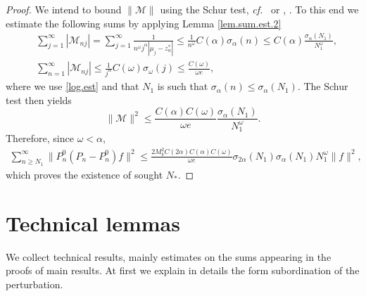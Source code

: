 \begin{proof}
We intend to bound $\|\mathcal{M}\|$ using the Schur test, {\emph{cf.}}~\cite{Schur-1911-140} or \cite[Sec. 3]{Dym-2003-210}, \cite[Thm. 5.2]{Halmos-1978-96}. To this end we estimate the following sums by applying Lemma \ref{lem.sum.est.2}
\begin{equation*}
\begin{aligned}
& \sum_{j=1}^{\infty}|\mathcal{M}_{nj}| 
=
\sum_{j=1}^{\infty} \frac{1}{n^{\omega}j^{\alpha}|\mu_j-z_n^*|}
\leq 
\frac{1}{n^{\omega}} C(\alpha) \sigma_{\alpha}(n)
\leq 
C(\alpha) \frac{\sigma_{\alpha}(N_1)}{N_1^{\omega}},
\\
&\sum_{n=1}^{\infty}|\mathcal{M}_{nj}| 
\leq
\frac{1}{j^{\alpha}}
C(\omega)
\sigma_{\omega}(j)
\leq
\frac{C(\omega)}{\omega e}
,
\end{aligned}
\end{equation*}
where we use \eqref{log.est} and that $N_1$ is such that $\sigma_{\alpha}(n) \leq \sigma_{\alpha}(N_1)$. 
The Schur test then yields
\begin{equation*}
\|\mathcal{M}\|^2
\leq 
 \frac{C(\alpha) C(\omega)}{\omega e}   
\frac{\sigma_{\alpha}(N_1)}{N_1^{\omega}}.
\end{equation*}
Therefore, since $\omega < \alpha$, 
\begin{equation*}
\begin{aligned}
\sum_{n\geq N_1}^{\infty} \|P_n^0(P_n-P_n^0)f\|^2 
\leq  
\frac{2 M_b^2 C(2\alpha) C(\alpha) C(\omega)}{\omega e}   
\sigma_{2\alpha}(N_1) \sigma_{\alpha}(N_1) N_1^{\omega} 
\|f\|^2,
\end{aligned}
\end{equation*}
which proves the existence of sought $N_*$.

\end{proof}

\section{Technical lemmas}
\label{sec.tech.lem}

We collect technical results, mainly estimates on the sums appearing in the proofs of main results. At first we explain in details the form subordination of the perturbation.

